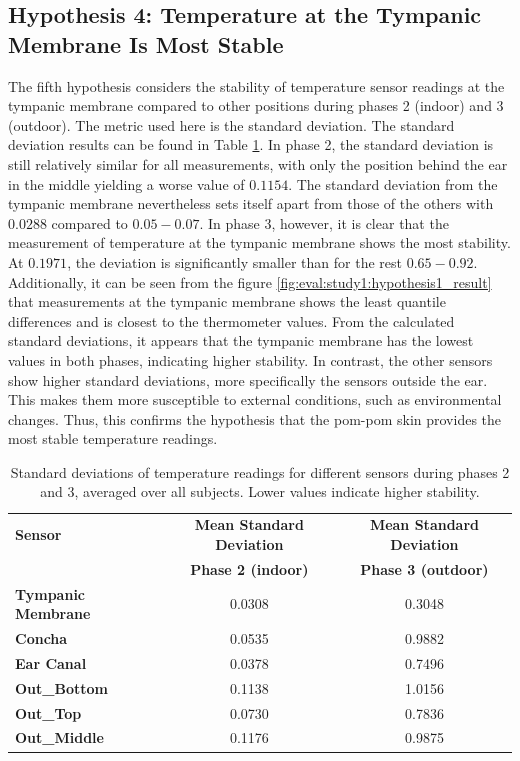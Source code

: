 \subsection{Hypothesis 4: Temperature at the Tympanic Membrane Is Most Stable}
\label{subsec:Evaluation:Study1:Hypothesis4}
The fifth hypothesis considers the stability of temperature sensor readings at the tympanic membrane compared to other positions during phases 2 (indoor) and 3 (outdoor).
The metric used here is the standard deviation. 
The standard deviation results can be found in Table \ref{subsec:Evaluation:Study1:Hypothesis4:std_dev_table}. 
In phase 2, the standard deviation is still relatively similar for all measurements, with only the position behind the ear in the middle yielding a worse value of $0.1154$. 
The standard deviation from the tympanic membrane nevertheless sets itself apart from those of the others with $0.0288$ compared to $0.05-0.07$. 
In phase 3, however, it is clear that the measurement of temperature at the tympanic membrane shows the most stability. 
At $0.1971$, the deviation is significantly smaller than for the rest $0.65-0.92$. 
Additionally, it can be seen from the figure \ref{fig:eval:study1:hypothesis1_result} that measurements at the tympanic membrane shows the least quantile differences and is closest to the thermometer values. 
From the calculated standard deviations, it appears that the tympanic membrane has the lowest values in both phases, indicating higher stability. 
In contrast, the other sensors show higher standard deviations, more specifically the sensors outside the ear. 
This makes them more susceptible to external conditions, such as environmental changes.
Thus, this confirms the hypothesis that the pom-pom skin provides the most stable temperature readings.

\begin{table}[t]
\centering
\begin{tabular}{|l|c|c|}
\hline
\textbf{Sensor} & \textbf{Mean Standard Deviation} & \textbf{Mean Standard Deviation} \\
& \textbf{Phase 2 (indoor)} & \textbf{Phase 3 (outdoor)} \\
\hline
\textbf{Tympanic Membrane} & 0.0308 & 0.3048 \\
\textbf{Concha} & 0.0535 & 0.9882 \\
\textbf{Ear Canal} & 0.0378 & 0.7496 \\
\textbf{Out\_Bottom} & 0.1138 & 1.0156 \\
\textbf{Out\_Top} & 0.0730 & 0.7836 \\
\textbf{Out\_Middle} & 0.1176 & 0.9875 \\
\hline
\end{tabular}
\caption{Standard deviations of temperature readings for different sensors during phases 2 and 3, averaged over all subjects. Lower values indicate higher stability.}
\label{subsec:Evaluation:Study1:Hypothesis4:std_dev_table}
\end{table}

